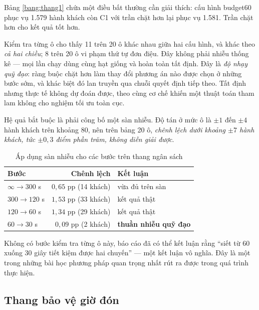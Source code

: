 Bảng \ref{bang:thang1} chứa một điều bất thường cần giải thích: cấu hình budget60 phục vụ 1.579
hành khách còn C1 với trần chặt hơn lại phục vụ 1.581. Trần chặt hơn cho kết quả tốt hơn.

Kiểm tra từng ô cho thấy 11 trên 20 ô khác nhau giữa hai cấu hình, và khác theo \emph{cả hai
chiều}; 8 trên 20 ô vi phạm thứ tự đơn điệu. Đây không phải nhiễu thống kê --- mọi lần chạy dùng
cùng hạt giống và hoàn toàn tất định. Đây là \emph{độ nhạy quỹ đạo}: ràng buộc chặt hơn làm thay
đổi phương án nào được chọn ở những bước sớm, và khác biệt đó lan truyền qua chuỗi quyết định
tiếp theo. Tất định nhưng thực tế không dự đoán được, theo cùng cơ chế khiến một thuật toán tham
lam không cho nghiệm tối ưu toàn cục.

Hệ quả bắt buộc là phải công bố một sàn nhiễu. Độ tán ở mức ô là $\pm 1$ đến $\pm 4$ hành khách
trên khoảng 80, nên trên bảng 20 ô, \emph{chênh lệch dưới khoảng $\pm 7$ hành khách, tức
$\pm 0{,}3$ điểm phần trăm, không diễn giải được}.

\begin{table}[htbp]
\centering
\caption{Áp dụng sàn nhiễu cho các bước trên thang ngân sách}
\label{bang:sannhieu}
\small
\begin{tabular}{@{}lrl@{}}
\toprule
\textbf{Bước} & \textbf{Chênh lệch} & \textbf{Kết luận}\\
\midrule
$\infty \to 300$ s & $0{,}65$ pp (14 khách) & vừa đủ trên sàn\\
$300 \to 120$ s & $1{,}53$ pp (33 khách) & kết quả thật\\
$120 \to 60$ s & $1{,}34$ pp (29 khách) & kết quả thật\\
$60 \to 30$ s & $0{,}09$ pp (2 khách) & \textbf{thuần nhiễu quỹ đạo}\\
\bottomrule
\end{tabular}
\end{table}

Không có bước kiểm tra từng ô này, báo cáo đã có thể kết luận rằng ``siết từ 60 xuống 30 giây
tiết kiệm được hai chuyến'' --- một kết luận vô nghĩa. Đây là một trong những bài học phương
pháp quan trọng nhất rút ra được trong quá trình thực hiện.

\subsection{Thang bảo vệ giờ đón}

